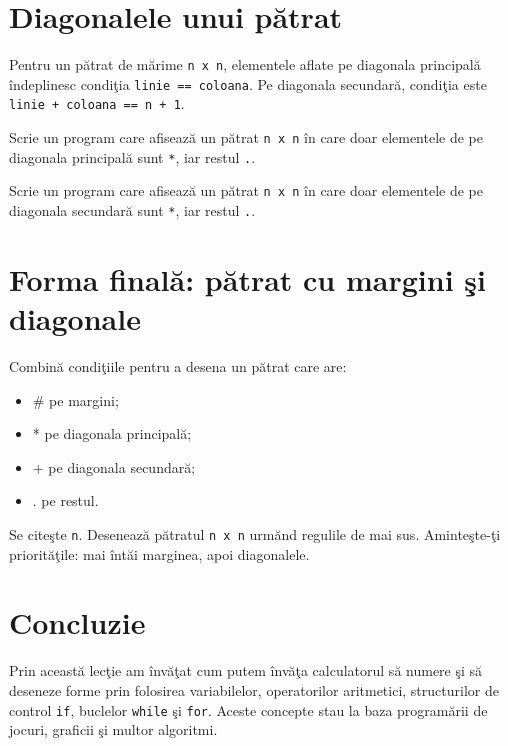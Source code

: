 \documentclass[11pt,a4paper]{article}
\begin{document}
\section*{Diagonalele unui p\u{a}trat}
Pentru un p\u{a}trat de m\u{a}rime \texttt{n x n}, elementele aflate pe diagonala principal\u{a} \^{i}ndeplinesc condi\c{t}ia \texttt{linie == coloana}. Pe diagonala secundar\u{a}, condi\c{t}ia este \texttt{linie + coloana == n + 1}.

\begin{tryit}
Scrie un program care afiseaz\u{a} un p\u{a}trat \texttt{n x n} \^{i}n care doar elementele de pe diagonala principal\u{a} sunt \texttt{*}, iar restul \texttt{.}.
\end{tryit}

\begin{tryit}
Scrie un program care afiseaz\u{a} un p\u{a}trat \texttt{n x n} \^{i}n care doar elementele de pe diagonala secundar\u{a} sunt \texttt{*}, iar restul \texttt{.}.
\end{tryit}

\section*{Forma final\u{a}: p\u{a}trat cu margini \c{s}i diagonale}
Combin\u{a} condi\c{t}iile pentru a desena un p\u{a}trat care are:
\begin{itemize}
\item \# pe margini;
\item * pe diagonala principal\u{a};
\item + pe diagonala secundar\u{a};
\item . pe restul.
\end{itemize}

\begin{tryit}
Se cite\c{s}te \texttt{n}. Deseneaz\u{a} p\u{a}tratul \texttt{n x n} urm\u{a}nd regulile de mai sus. Aminte\c{s}te-\c{t}i priorit\u{a}\c{t}ile: mai \^{i}nt\u{a}i marginea, apoi diagonalele.
\end{tryit}

\section*{Concluzie}
Prin aceast\u{a} lec\c{t}ie am \^{i}nv\u{a}\c{t}at cum putem \^{i}nv\u{a}\c{t}a calculatorul s\u{a} numere \c{s}i s\u{a} deseneze forme prin folosirea variabilelor, operatorilor aritmetici, structurilor de control \texttt{if}, buclelor \texttt{while} \c{s}i \texttt{for}. Aceste concepte stau la baza program\u{a}rii de jocuri, graficii \c{s}i multor algoritmi.
\end{document}
